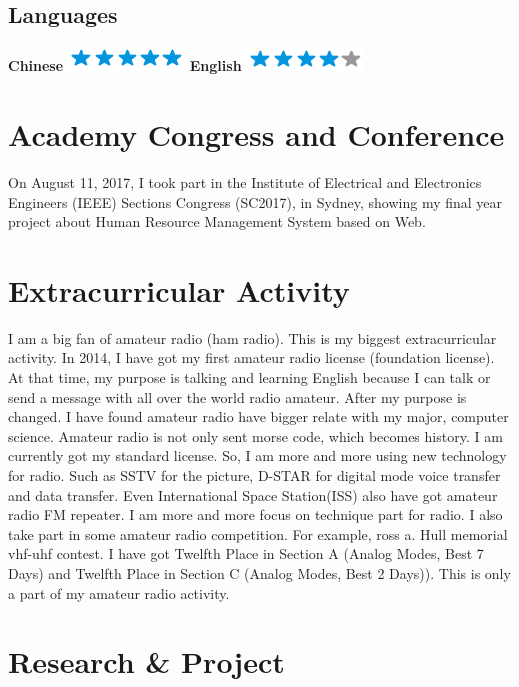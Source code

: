 \documentclass[]{friggeri-cv}
\begin{document}
\begin{aside}
  \section{Languages}
    \textbf{Chinese}\includegraphics[scale=0.40]{img/5stars.png}
    \textbf{English}\includegraphics[scale=0.40]{img/4stars.png}
\end{aside}

\section{Academy Congress and Conference}
On August 11, 2017, I took part in the Institute of Electrical and Electronics Engineers (IEEE) Sections Congress (SC2017), in Sydney, showing my final year project about Human Resource Management System based on Web.

\section{Extracurricular Activity}
I am a big fan of amateur radio (ham radio).
This is my biggest extracurricular activity.
In 2014, I have got my first amateur radio license (foundation license).
At that time, my purpose is talking and learning English because I can talk or send a message with all over the world radio amateur.
After my purpose is changed. I have found amateur radio have bigger relate with my major, computer science.
Amateur radio is not only sent morse code, which becomes history.
I am currently got my standard license.
So, I am more and more using new technology for radio.
Such as SSTV for the picture, D-STAR for digital mode voice transfer and data transfer.
Even International Space Station(ISS) also have got amateur radio FM repeater.
I am more and more focus on technique part for radio.
I also take part in some amateur radio competition.
For example, ross a. Hull memorial vhf-uhf contest.
I have got Twelfth Place in Section A (Analog Modes, Best 7 Days) and Twelfth Place in Section C (Analog Modes, Best 2 Days)).
This is only a part of my amateur radio activity.

\section{Research \& Project}
\end{document}
